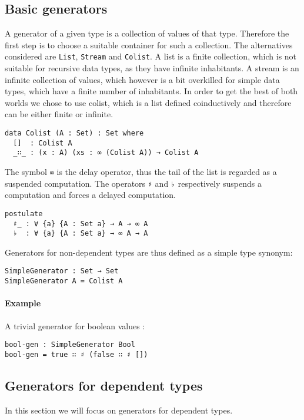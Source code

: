 \documentclass[10pt,a4paper]{article}
\begin{document}
\subsection{Basic generators}
A generator of a given type is a collection of values of that type.
Therefore the first step is to choose a suitable container for such a collection. The alternatives considered are \texttt{List}, \texttt{Stream} and \texttt{Colist}. A list is a finite collection, which is not suitable for recursive data types, as they have infinite inhabitants. A stream is an infinite collection of values, which however is a bit overkilled for simple data types, which have a finite number of inhabitants. In order to get the best of both worlds we chose to use colist, which is a list defined coinductively and therefore can be either finite or infinite.

\begin{verbatim}
data Colist (A : Set) : Set where
  []  : Colist A
  _∷_ : (x : A) (xs : ∞ (Colist A)) → Colist A
\end{verbatim}
The symbol \texttt{∞} is the delay operator, thus the tail of the list is regarded as a suspended computation. The operators \texttt{♯} and \texttt{♭} respectively suspends a computation and forces a delayed computation.
\begin{verbatim}
postulate
  ♯_ : ∀ {a} {A : Set a} → A → ∞ A
  ♭  : ∀ {a} {A : Set a} → ∞ A → A
\end{verbatim}  
Generators for non-dependent types are thus defined as a simple type synonym:
\begin{verbatim}
SimpleGenerator : Set → Set
SimpleGenerator A = Colist A
\end{verbatim}

\paragraph{Example}
A trivial generator for boolean values : 
\begin{verbatim}
bool-gen : SimpleGenerator Bool
bool-gen = true ∷ ♯ (false ∷ ♯ [])
\end{verbatim}

\subsection{Generators for dependent types}
In this section we will focus on generators for dependent types.
\end{document}
